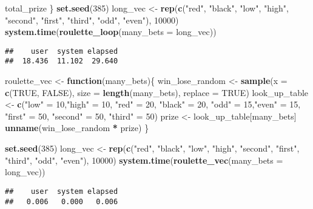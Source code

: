 \documentclass[]{article}
\newenvironment{Shaded}{\begin{snugshade}}{\end{snugshade}}
\newcommand{\ControlFlowTok}[1]{\textcolor[rgb]{0.13,0.29,0.53}{\textbf{#1}}}
\newcommand{\DataTypeTok}[1]{\textcolor[rgb]{0.13,0.29,0.53}{#1}}
\newcommand{\DecValTok}[1]{\textcolor[rgb]{0.00,0.00,0.81}{#1}}
\newcommand{\KeywordTok}[1]{\textcolor[rgb]{0.13,0.29,0.53}{\textbf{#1}}}
\newcommand{\NormalTok}[1]{#1}
\newcommand{\OperatorTok}[1]{\textcolor[rgb]{0.81,0.36,0.00}{\textbf{#1}}}
\newcommand{\OtherTok}[1]{\textcolor[rgb]{0.56,0.35,0.01}{#1}}
\newcommand{\StringTok}[1]{\textcolor[rgb]{0.31,0.60,0.02}{#1}}
\begin{document}
\begin{Shaded}
\begin{Highlighting}[]
\NormalTok{  total_prize}
\NormalTok{\}}
\KeywordTok{set.seed}\NormalTok{(}\DecValTok{385}\NormalTok{)}
\NormalTok{long_vec <-}\StringTok{ }\KeywordTok{rep}\NormalTok{(}\KeywordTok{c}\NormalTok{(}\StringTok{"red"}\NormalTok{, }\StringTok{"black"}\NormalTok{, }\StringTok{"low"}\NormalTok{, }\StringTok{"high"}\NormalTok{, }\StringTok{"second"}\NormalTok{, }\StringTok{"first"}\NormalTok{, }\StringTok{"third"}\NormalTok{,}
                  \StringTok{"odd"}\NormalTok{, }\StringTok{"even"}\NormalTok{), }\DecValTok{10000}\NormalTok{)}
\KeywordTok{system.time}\NormalTok{(}\KeywordTok{roulette_loop}\NormalTok{(}\DataTypeTok{many_bets =}\NormalTok{ long_vec))}
\end{Highlighting}
\end{Shaded}

\begin{verbatim}
##    user  system elapsed 
##  18.436  11.102  29.640
\end{verbatim}

\begin{Shaded}
\begin{Highlighting}[]
\NormalTok{roulette_vec <-}\StringTok{ }\ControlFlowTok{function}\NormalTok{(many_bets)\{}
\NormalTok{  win_lose_random <-}\StringTok{ }\KeywordTok{sample}\NormalTok{(}\DataTypeTok{x =} \KeywordTok{c}\NormalTok{(}\OtherTok{TRUE}\NormalTok{, }\OtherTok{FALSE}\NormalTok{), }\DataTypeTok{size =} \KeywordTok{length}\NormalTok{(many_bets),}
                            \DataTypeTok{replace =} \OtherTok{TRUE}\NormalTok{)}
\NormalTok{  look_up_table <-}\StringTok{ }\KeywordTok{c}\NormalTok{(}\StringTok{"low"}\NormalTok{ =}\StringTok{ }\DecValTok{10}\NormalTok{,}\StringTok{"high"}\NormalTok{ =}\StringTok{ }\DecValTok{10}\NormalTok{, }\StringTok{"red"}\NormalTok{ =}\StringTok{ }\DecValTok{20}\NormalTok{, }\StringTok{"black"}\NormalTok{ =}\StringTok{ }\DecValTok{20}\NormalTok{, }\StringTok{"odd"}\NormalTok{ =}\StringTok{   }\DecValTok{15}\NormalTok{,}\StringTok{"even"}\NormalTok{ =}\StringTok{ }\DecValTok{15}\NormalTok{,}
                     \StringTok{"first"}\NormalTok{ =}\StringTok{ }\DecValTok{50}\NormalTok{, }\StringTok{"second"}\NormalTok{ =}\StringTok{ }\DecValTok{50}\NormalTok{, }\StringTok{"third"}\NormalTok{ =}\StringTok{ }\DecValTok{50}\NormalTok{)}
\NormalTok{  prize <-}\StringTok{ }\NormalTok{look_up_table[many_bets]}
  \KeywordTok{unname}\NormalTok{(win_lose_random }\OperatorTok{*}\StringTok{ }\NormalTok{prize)}
\NormalTok{\}}


\KeywordTok{set.seed}\NormalTok{(}\DecValTok{385}\NormalTok{)}
\NormalTok{long_vec <-}\StringTok{ }\KeywordTok{rep}\NormalTok{(}\KeywordTok{c}\NormalTok{(}\StringTok{"red"}\NormalTok{, }\StringTok{"black"}\NormalTok{, }\StringTok{"low"}\NormalTok{, }\StringTok{"high"}\NormalTok{, }\StringTok{"second"}\NormalTok{, }\StringTok{"first"}\NormalTok{, }\StringTok{"third"}\NormalTok{,}
                  \StringTok{"odd"}\NormalTok{, }\StringTok{"even"}\NormalTok{), }\DecValTok{10000}\NormalTok{)}
\KeywordTok{system.time}\NormalTok{(}\KeywordTok{roulette_vec}\NormalTok{(}\DataTypeTok{many_bets =}\NormalTok{ long_vec))}
\end{Highlighting}
\end{Shaded}

\begin{verbatim}
##    user  system elapsed 
##   0.006   0.000   0.006
\end{verbatim}
\end{document}

